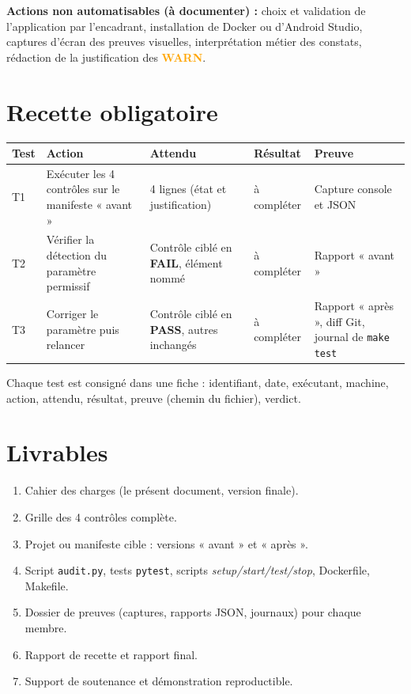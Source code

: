 \documentclass[11pt,a4paper]{article}
\newcommand{\code}[1]{{\NoAutoSpacing\texttt{\small #1}}}
\newcommand{\code}[1]{{\texttt{\small #1}}}
\newcommand{\PASS}{\textbf{\textcolor{vert}{PASS}}}
\newcommand{\FAIL}{\textbf{\textcolor{rouge}{FAIL}}}
\newcommand{\WARN}{\textbf{\textcolor{orange}{WARN}}}
\begin{document}
\textbf{Actions non automatisables (à documenter) :} choix et validation de l'application par l'encadrant, installation de Docker ou d'Android Studio, captures d'écran des preuves visuelles, interprétation métier des constats, rédaction de la justification des \WARN{}.

\section{Recette obligatoire}
\begin{longtable}{@{}L{0.9cm}L{3.3cm}L{3.3cm}L{2.2cm}L{3.6cm}@{}}
\color{white}\bfseries Test & \color{white}\bfseries Action & \color{white}\bfseries Attendu & \color{white}\bfseries Résultat & \color{white}\bfseries Preuve\\
\endhead
T1 & Exécuter les 4 contrôles sur le manifeste « avant » & 4 lignes (état et justification) & à compléter & Capture console et JSON\\
T2 & Vérifier la détection du paramètre permissif & Contrôle ciblé en \FAIL{}, élément nommé & à compléter & Rapport « avant »\\
T3 & Corriger le paramètre puis relancer & Contrôle ciblé en \PASS{}, autres inchangés & à compléter & Rapport « après », diff Git, journal de \code{make test}\\
\end{longtable}

Chaque test est consigné dans une fiche : identifiant, date, exécutant, machine, action, attendu, résultat, preuve (chemin du fichier), verdict.

\section{Livrables}
\begin{enumerate}
  \item Cahier des charges (le présent document, version finale).
  \item Grille des 4 contrôles complète.
  \item Projet ou manifeste cible : versions « avant » et « après ».
  \item Script \code{audit.py}, tests \code{pytest}, scripts \textit{setup/start/test/stop}, Dockerfile, Makefile.
  \item Dossier de preuves (captures, rapports JSON, journaux) pour chaque membre.
  \item Rapport de recette et rapport final.
  \item Support de soutenance et démonstration reproductible.
\end{enumerate}
\end{document}
